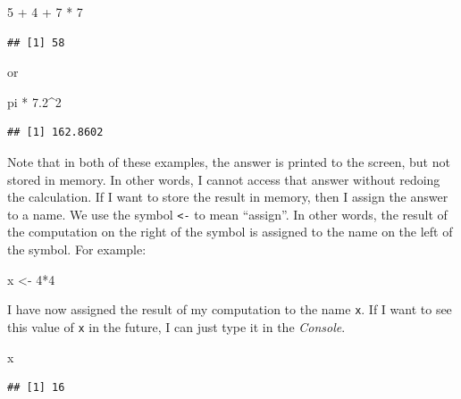 \documentclass[]{book}
\newenvironment{Shaded}{\begin{snugshade}}{\end{snugshade}}
\newcommand{\DecValTok}[1]{\textcolor[rgb]{0.00,0.00,0.81}{{#1}}}
\newcommand{\FloatTok}[1]{\textcolor[rgb]{0.00,0.00,0.81}{{#1}}}
\newcommand{\StringTok}[1]{\textcolor[rgb]{0.31,0.60,0.02}{{#1}}}
\newcommand{\NormalTok}[1]{{#1}}
\begin{document}
\begin{Shaded}
\begin{Highlighting}[]
\DecValTok{5} \NormalTok{+}\StringTok{ }\DecValTok{4} \NormalTok{+}\StringTok{ }\DecValTok{7} \NormalTok{*}\StringTok{ }\DecValTok{7}
\end{Highlighting}
\end{Shaded}

\begin{verbatim}
## [1] 58
\end{verbatim}

or

\begin{Shaded}
\begin{Highlighting}[]
\NormalTok{pi *}\StringTok{ }\FloatTok{7.2}\NormalTok{^}\DecValTok{2}
\end{Highlighting}
\end{Shaded}

\begin{verbatim}
## [1] 162.8602
\end{verbatim}

Note that in both of these examples, the answer is printed to the
screen, but not stored in memory. In other words, I cannot access that
answer without redoing the calculation. If I want to store the result in
memory, then I assign the answer to a name. We use the symbol
\texttt{\textless{}-} to mean ``assign''. In other words, the result of
the computation on the right of the symbol is assigned to the name on
the left of the symbol. For example:

\begin{Shaded}
\begin{Highlighting}[]
\NormalTok{x <-}\StringTok{ }\DecValTok{4}\NormalTok{*}\DecValTok{4}
\end{Highlighting}
\end{Shaded}

I have now assigned the result of my computation to the name \texttt{x}.
If I want to see this value of \texttt{x} in the future, I can just type
it in the \emph{Console}.

\begin{Shaded}
\begin{Highlighting}[]
\NormalTok{x}
\end{Highlighting}
\end{Shaded}

\begin{verbatim}
## [1] 16
\end{verbatim}
\end{document}
